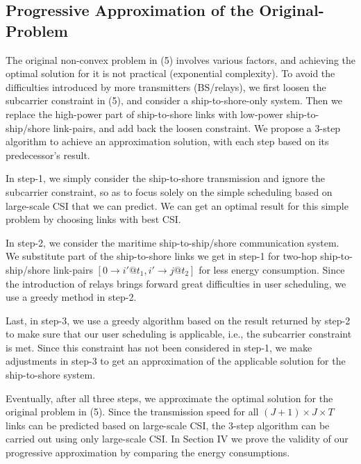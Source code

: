 \documentclass[conference]{IEEEtran}
\begin{document}
 
 \subsection{Progressive Approximation of the Original-Problem}
 
 The original non-convex problem in (5) involves various factors, and achieving the optimal solution for it is not practical (exponential complexity). To avoid the difficulties introduced by more transmitters (BS/relays), we first loosen the subcarrier constraint in (5), and consider a ship-to-shore-only system. Then we replace the high-power part of ship-to-shore links with low-power ship-to-ship/shore link-pairs, and add back the loosen constraint. We propose a 3-step algorithm to achieve an approximation solution, with each step based on its predecessor's result. 
 
 In step-1, we simply consider the ship-to-shore transmission and ignore the subcarrier constraint, so as to focus solely on the simple scheduling based on large-scale CSI that we can predict. 
 We can get an optimal result for this simple problem by choosing links with best CSI. 
 
 In step-2, we consider the maritime ship-to-ship/shore communication system. We substitute part of the ship-to-shore links we get in step-1 for two-hop ship-to-ship/shore link-pairs $\left[ {0 \to i'@{t_1},i' \to j@{t_2}} \right]$ for less energy consumption. Since the introduction of relays brings forward great difficulties in user scheduling, we use a greedy method in step-2. %
 
 Last, in step-3, we use a greedy algorithm based on the result returned by step-2 to make sure that our user scheduling is applicable, i.e., the subcarrier constraint is met. Since this constraint has not been considered in step-1, we make adjustments in step-3 to get an approximation of the applicable solution for the ship-to-shore system. 

 Eventually, after all three steps, we approximate the optimal solution for the original problem in (5). Since the transmission speed for all $\left( J+1 \right) \times J \times T$ links can be predicted based on large-scale CSI, the 3-step algorithm can be carried out using only large-scale CSI. In Section IV we prove the validity of our progressive approximation by comparing the energy consumptions. 
 
\end{document}

